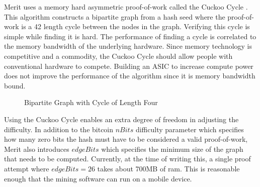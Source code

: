 \documentclass{article}
\begin{document}
Merit uses a memory hard asymmetric proof-of-work called the Cuckoo Cycle \cite{cuckoo}. 
This algorithm constructs a bipartite graph from a hash seed where the
proof-of-work is a 42 length cycle between the nodes in the graph. Verifying
this cycle is simple while finding it is hard. The performance of finding a
cycle is correlated to the memory bandwidth of the underlying hardware. Since
memory technology is competitive and a commodity, the Cuckoo Cycle should allow
people with conventional hardware to compete. Building an ASIC to increase compute
power does not improve the performance of the algorithm since it is memory
bandwidth bound.

\begin{figure}[H]
    \begin{center}
    \end{center}
    \caption{Bipartite Graph with Cycle of Length Four}
\end{figure}

Using the Cuckoo Cycle enables an extra degree of freedom in adjusting the difficulty.
In addition to the bitcoin $nBits$ difficulty parameter which specifies how many
zero bits the hash must have to be considered a valid proof-of-work, Merit also
introduces $edgeBits$ which specifies the minimum size of the graph that needs to be computed.
Currently, at the time of writing this, a single proof attempt where $edgeBits=26$
takes about 700MB of ram. This is reasonable enough that the mining software can
run on a mobile device.
\end{document}
